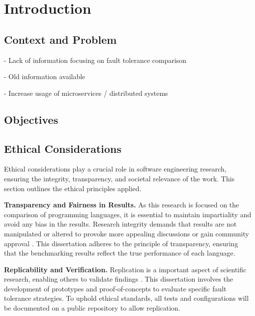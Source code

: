 % 
\chapter{Introduction} %
\label{chap:Chapter1} %


%
\section{Context and Problem} 

- Lack of information focusing on fault tolerance comparison

- Old information available

- Increase usage of microservices / distributed systems 

\section{Objectives}


\section{Ethical Considerations}

Ethical considerations play a crucial role in software engineering research, ensuring the integrity, transparency, and societal relevance of the work. This section outlines the ethical principles applied.

\textbf{Transparency and Fairness in Results.} As this research is focused on the comparison of programming languages, it is essential to maintain impartiality and avoid any bias in the results. Research integrity demands that results are not manipulated or altered to provoke more appealing discussions or gain community approval \cite{EthicDeb2018}. This dissertation adheres to the principle of transparency, ensuring that the benchmarking results reflect the true performance of each language.

\textbf{Replicability and Verification.} Replication is a important aspect of scientific research, enabling others to validate findings \cite{nspe-ethics}. This dissertation involves the development of prototypes and proof-of-concepts to evaluate specific fault tolerance strategies. To uphold ethical standards, all tests and configurations will be documented on a public repository to allow replication.

